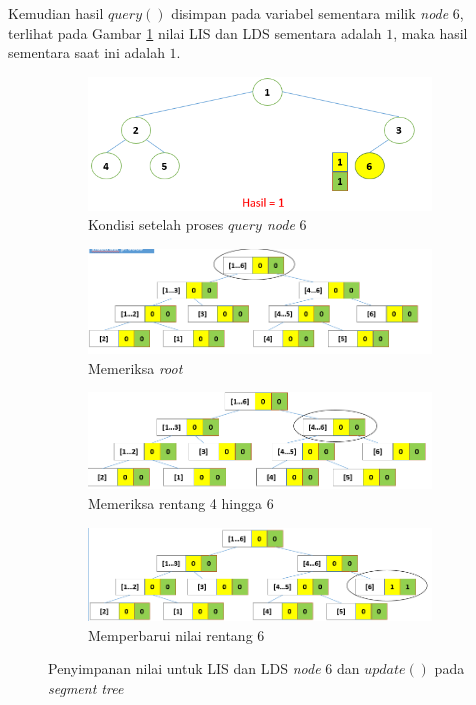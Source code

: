 \quad Kemudian hasil \textit{$query()$} disimpan pada variabel sementara milik \textit{node} 6, terlihat pada Gambar \ref{fig:subproses15} nilai LIS dan LDS sementara adalah $1$, maka hasil sementara saat ini adalah $1$.
\begin{figure}[H]
	\begin{subfigure}{1.0\textwidth}
		\centering
		\includegraphics[scale=0.33]{assets/images/Ilustrasi_proses_15.PNG}
		\caption{Kondisi setelah proses \textit{$query$ node} 6}
		\label{fig:subproses15}
	\end{subfigure}
	\begin{subfigure}{1.0\textwidth}
		\centering
		\includegraphics[scale=0.33]{assets/images/Ilustrasi_proses_16.PNG}
		\caption{Memeriksa \textit{root}}
		\label{fig:subproses16}
	\end{subfigure}
	\begin{subfigure}{1.0\textwidth}
		\centering
		\includegraphics[scale=0.33]{assets/images/Ilustrasi_proses_17.PNG}
		\caption{Memeriksa rentang 4 hingga 6}
		\label{fig:subproses17}
	\end{subfigure}
	\begin{subfigure}{1.0\textwidth}
		\centering
		\includegraphics[scale=0.33]{assets/images/Ilustrasi_proses_18.PNG}
		\caption{Memperbarui nilai rentang 6}
		\label{fig:subproses18}
	\end{subfigure}
	\caption{Penyimpanan nilai untuk LIS dan LDS \textit{node} 6 dan \textit{$update()$} pada \textit{segment tree}}
	\label{fig:proses4}
\end{figure}\newpage
